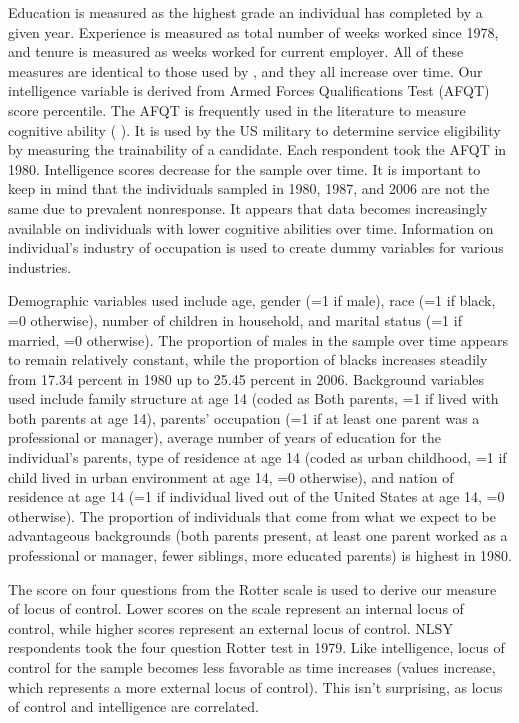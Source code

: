 \documentclass[12pt]{report}
\newcommand{\citee}[1]{\citename{#1} \citeyear{#1}}
\begin{document}
Education is measured as the highest grade an individual has completed by a given year. Experience is measured as total number of weeks worked since 1978, and tenure is measured as weeks worked for current employer. All of these measures are identical to those used by \citee{GVD1997}, and they all increase over time. Our intelligence variable is derived from Armed Forces Qualifications Test (AFQT) score percentile. The AFQT is frequently used in the literature to measure cognitive ability (\citee{HSU2006}). It is used by the US military to determine service eligibility by measuring the trainability of a candidate. Each respondent took the AFQT in 1980. Intelligence scores decrease for the sample over time. It is important to keep in mind that the individuals sampled in 1980, 1987, and 2006 are not the same due to prevalent nonresponse. It appears that data becomes increasingly available on individuals with lower cognitive abilities over time. Information on individual's industry of occupation is used to create dummy variables for various industries.

Demographic variables used include age, gender (=1 if male), race (=1 if black, =0 otherwise), number of children in household, and marital status (=1 if married, =0 otherwise). The proportion of males in the sample over time appears to remain relatively constant, while the proportion of blacks increases steadily from 17.34 percent in 1980 up to 25.45 percent in 2006. Background variables used include family structure at age 14 (coded as Both parents, =1 if lived with both parents at age 14), parents' occupation (=1 if at least one parent was a professional or manager), average number of years of education for the individual's parents, type of residence at age 14 (coded as urban childhood, =1 if child lived in urban environment at age 14, =0 otherwise),  and nation of residence at age 14 (=1 if individual lived out of the United States at age 14, =0 otherwise). The proportion of individuals that come from what we expect to be advantageous backgrounds (both parents present, at least one parent worked as a professional or manager, fewer siblings, more educated parents) is highest in 1980.

The score on four questions from the Rotter scale is used to derive our measure of locus of control.  Lower scores on the scale represent an internal locus of control, while higher scores represent an external locus of control. NLSY respondents took the four question Rotter test in 1979. Like intelligence, locus of control for the sample becomes less favorable as time increases (values increase, which represents a more external locus of control). This isn't surprising, as locus of control and intelligence are correlated.
\end{document}
